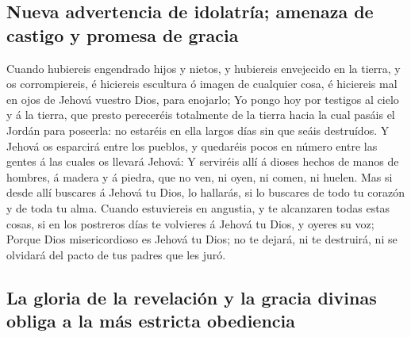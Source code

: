 \hypertarget{nueva-advertencia-de-idolatruxeda-amenaza-de-castigo-y-promesa-de-gracia}{%
\subsection{Nueva advertencia de idolatría; amenaza de castigo y promesa
de
gracia}\label{nueva-advertencia-de-idolatruxeda-amenaza-de-castigo-y-promesa-de-gracia}}

 Cuando hubiereis engendrado hijos y nietos, y hubiereis
envejecido en la tierra, y os corrompiereis, é hiciereis escultura ó
imagen de cualquier cosa, é hiciereis mal en ojos de Jehová vuestro
Dios, para enojarlo;  Yo pongo hoy por testigos al cielo
y á la tierra, que presto pereceréis totalmente de la tierra hacia la
cual pasáis el Jordán para poseerla: no estaréis en ella largos días sin
que seáis destruídos.  Y Jehová os esparcirá entre los
pueblos, y quedaréis pocos en número entre las gentes á las cuales os
llevará Jehová:  Y serviréis allí á dioses hechos de
manos de hombres, á madera y á piedra, que no ven, ni oyen, ni comen, ni
huelen.  Mas si desde allí buscares á Jehová tu Dios, lo
hallarás, si lo buscares de todo tu corazón y de toda tu alma.
 Cuando estuviereis en angustia, y te alcanzaren todas
estas cosas, si en los postreros días te volvieres á Jehová tu Dios, y
oyeres su voz;  Porque Dios misericordioso es Jehová tu
Dios; no te dejará, ni te destruirá, ni se olvidará del pacto de tus
padres que les juró.

\hypertarget{la-gloria-de-la-revelaciuxf3n-y-la-gracia-divinas-obliga-a-la-muxe1s-estricta-obediencia}{%
\subsection{La gloria de la revelación y la gracia divinas obliga a la
más estricta
obediencia}\label{la-gloria-de-la-revelaciuxf3n-y-la-gracia-divinas-obliga-a-la-muxe1s-estricta-obediencia}}

